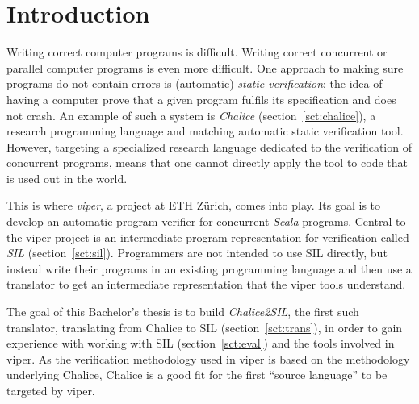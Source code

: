 
\section{Introduction}
Writing correct computer programs is difficult. 
Writing correct concurrent or parallel computer programs is even more difficult. 
One approach to making sure programs do not contain errors is (automatic) \emph{static verification}: the idea of having a computer prove that a given program fulfils its specification and does not crash.
An example of such a system is \emph{Chalice} \cite{LMS09} (section~\ref{sct:chalice}), a research programming language and matching automatic static verification tool.
However, targeting a specialized research language dedicated to the verification of concurrent programs, means that one cannot directly apply the tool to code that is used out in the world.

This is where \emph{viper}, a project at ETH Zürich, comes into play.
Its goal is to develop an automatic program verifier for concurrent \emph{Scala} \cite{Scala} programs.
Central to the viper project is an intermediate program representation for verification called \emph{SIL} (section~\ref{sct:sil}).
Programmers are not intended to use SIL directly, but instead write their programs in an existing programming  language and then use a translator to get an intermediate representation that the viper tools understand.

The goal of this Bachelor's thesis is to build \emph{Chalice2SIL}, the first such translator, translating from Chalice to SIL (section~\ref{sct:trans}), in order to gain experience with working with SIL (section~\ref{sct:eval}) and the tools involved in viper.
As the verification methodology used in viper is based on the methodology underlying Chalice, Chalice is a good fit for the first ``source language'' to be targeted by viper.